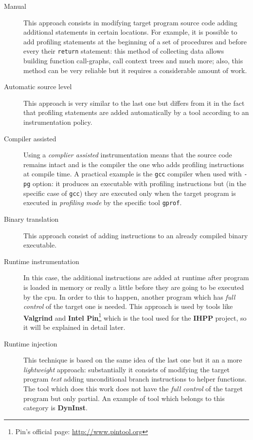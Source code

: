 \documentclass[a4paper,11pt]{report}
\begin{document}
\begin{description}
\begin{description}
\item[Manual]
This approach consists in modifying target program source code adding additional
statements in certain locations. For example, it is possible to add profiling
statements at the beginning of a set of procedures and before every their
\verb|return| statement: this method of collecting data allows building function
call-graphs, call context trees and much more; also, this method can be very
reliable but it requires a considerable amount of work.

\item[Automatic source level] This approach is very similar to the last one but
differs from it in the fact that profiling statements are added automatically by
a tool according to an instrumentation policy.

\item[Compiler assisted] Using a \emph{complier assisted} instrumentation means
that the source code remains intact and is the compiler the one who adds
profiling instructions at compile time. A practical example is the \verb|gcc| compiler when
used with \verb|-pg| option: it produces an executable with profiling
instructions but (in the specific case of \verb|gcc|) they are executed only when the
target program is executed in \emph{profiling mode} by the specific tool
\verb|gprof|.

\item[Binary translation]
This approach consist of adding instructions to an already compiled binary executable.

\item[Runtime instrumentation]
In this case, the additional instructions are added at runtime after program is
loaded in memory or really a little before they are going to be executed by the
cpu. In order to this to happen, another program which has \emph{full control}
of the target one is needed. This approach is used by tools like
\textbf{Valgrind} and \textbf{Intel Pin}\footnote{Pin's official page:
\url{http://www.pintool.org}} which is the tool used for the \textbf{IHPP}
project, so it will be explained in detail later.

\item[Runtime injection] This technique is based on the same idea of the last
one but it an a more \emph{lightweight} approach: substantially it consists of
modifying the target program \emph{text} adding unconditional branch
instructions to helper functions. The tool which does this work does not have the
\emph{full control} of the target program but only partial. An example of tool
which belongs to this category is \textbf{DynInst}.


\end{description}
\end{description}
\end{document}
